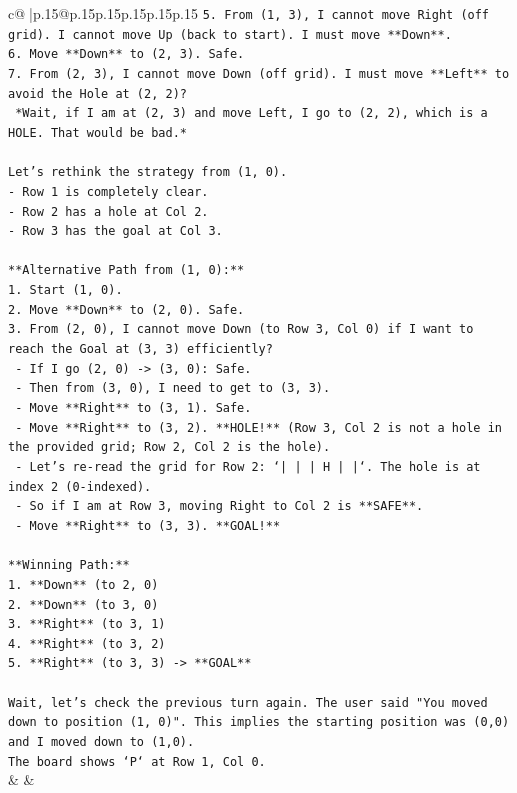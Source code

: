 \documentclass{article}
\begin{document}
{\begin{supertabular}{c@{$\;$}|p{.15\linewidth}@{}p{.15\linewidth}p{.15\linewidth}p{.15\linewidth}p{.15\linewidth}p{.15\linewidth}}
{{{\texttt{5.  From (1, 3), I cannot move Right (off grid). I cannot move Up (back to start). I must move **Down**.} \\
\texttt{6.  Move **Down** to (2, 3). Safe.} \\
\texttt{7.  From (2, 3), I cannot move Down (off grid). I must move **Left** to avoid the Hole at (2, 2)?} \\
\texttt{    *Wait, if I am at (2, 3) and move Left, I go to (2, 2), which is a HOLE. That would be bad.*} \\
\\ 
\texttt{Let's rethink the strategy from (1, 0).} \\
\texttt{{-} Row 1 is completely clear.} \\
\texttt{{-} Row 2 has a hole at Col 2.} \\
\texttt{{-} Row 3 has the goal at Col 3.} \\
\\ 
\texttt{**Alternative Path from (1, 0):**} \\
\texttt{1.  Start (1, 0).} \\
\texttt{2.  Move **Down** to (2, 0). Safe.} \\
\texttt{3.  From (2, 0), I cannot move Down (to Row 3, Col 0) if I want to reach the Goal at (3, 3) efficiently?} \\
\texttt{    {-} If I go (2, 0) {-}> (3, 0): Safe.} \\
\texttt{    {-} Then from (3, 0), I need to get to (3, 3).} \\
\texttt{    {-} Move **Right** to (3, 1). Safe.} \\
\texttt{    {-} Move **Right** to (3, 2). **HOLE!** (Row 3, Col 2 is not a hole in the provided grid; Row 2, Col 2 is the hole).} \\
\texttt{    {-} Let's re{-}read the grid for Row 2: `|     |     |  H  |     |`. The hole is at index 2 (0{-}indexed).} \\
\texttt{    {-} So if I am at Row 3, moving Right to Col 2 is **SAFE**.} \\
\texttt{    {-} Move **Right** to (3, 3). **GOAL!**} \\
\\ 
\texttt{**Winning Path:**} \\
\texttt{1.  **Down** (to 2, 0)} \\
\texttt{2.  **Down** (to 3, 0)} \\
\texttt{3.  **Right** (to 3, 1)} \\
\texttt{4.  **Right** (to 3, 2)} \\
\texttt{5.  **Right** (to 3, 3) {-}> **GOAL**} \\
\\ 
\texttt{Wait, let's check the previous turn again. The user said "You moved down to position (1, 0)". This implies the starting position was (0,0) and I moved down to (1,0).} \\
\texttt{The board shows `P` at Row 1, Col 0.} \\
            }
        }
    }
    & & \\ \\


\end{supertabular}}
\end{document}
